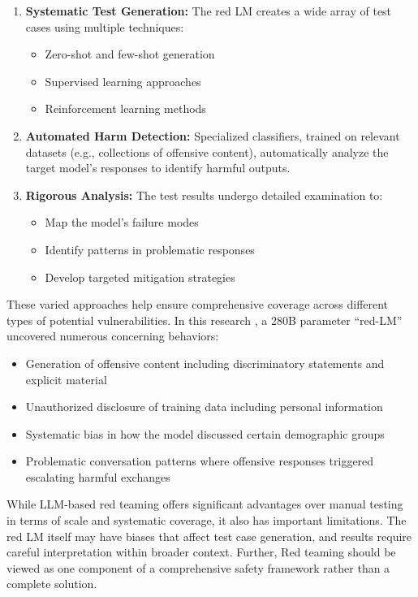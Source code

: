 \begin{enumerate}
    \item \textbf{Systematic Test Generation:} The red LM creates a wide array of test cases using multiple techniques:
    \begin{itemize}
        \item Zero-shot and few-shot generation
        \item Supervised learning approaches
        \item Reinforcement learning methods
    \end{itemize}
    
    \item \textbf{Automated Harm Detection:} Specialized classifiers, trained on relevant datasets (e.g., collections of offensive content), automatically analyze the target model's responses to identify harmful outputs.
    
    \item \textbf{Rigorous Analysis:} The test results undergo detailed examination to:
    \begin{itemize}
        \item Map the model's failure modes
        \item Identify patterns in problematic responses
        \item Develop targeted mitigation strategies
    \end{itemize}
\end{enumerate}

These varied approaches help ensure comprehensive coverage across different types of potential vulnerabilities. In this research , a 280B parameter ``red-LM'' uncovered numerous concerning behaviors:

\begin{itemize}
    \item Generation of offensive content including discriminatory statements and explicit material
    \item Unauthorized disclosure of training data including personal information
    \item Systematic bias in how the model discussed certain demographic groups
    \item Problematic conversation patterns where offensive responses triggered escalating harmful exchanges
\end{itemize}

While LLM-based red teaming offers significant advantages over manual testing in terms of scale and systematic coverage, it also has important limitations. The red LM itself may have biases that affect test case generation, and results require careful interpretation within broader context. Further, Red teaming should be viewed as one component of a comprehensive safety framework rather than a complete solution.

